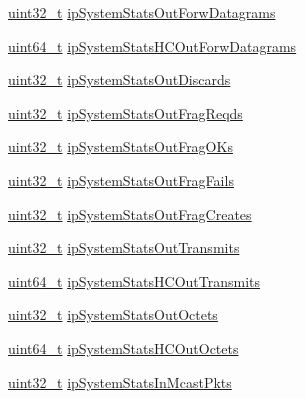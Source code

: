 \begin{DoxyCompactItemize}
\item 
\hyperlink{stdint_8h_a435d1572bf3f880d55459d9805097f62}{uint32\+\_\+t} \hyperlink{structIpMibIpSystemStatsEntry_a7b19227919fc80e74a32c51abe78580d}{ip\+System\+Stats\+Out\+Forw\+Datagrams}
\item 
\hyperlink{stdint_8h_aec6fcb673ff035718c238c8c9d544c47}{uint64\+\_\+t} \hyperlink{structIpMibIpSystemStatsEntry_a7a942eb4f7ddbf56b06186c30c6f6cf8}{ip\+System\+Stats\+H\+C\+Out\+Forw\+Datagrams}
\item 
\hyperlink{stdint_8h_a435d1572bf3f880d55459d9805097f62}{uint32\+\_\+t} \hyperlink{structIpMibIpSystemStatsEntry_a9f64d24e8d59a4f1aef22f0373aa34aa}{ip\+System\+Stats\+Out\+Discards}
\item 
\hyperlink{stdint_8h_a435d1572bf3f880d55459d9805097f62}{uint32\+\_\+t} \hyperlink{structIpMibIpSystemStatsEntry_a2956e47b05e37ace93061c103fb4c930}{ip\+System\+Stats\+Out\+Frag\+Reqds}
\item 
\hyperlink{stdint_8h_a435d1572bf3f880d55459d9805097f62}{uint32\+\_\+t} \hyperlink{structIpMibIpSystemStatsEntry_aefaf0fd7a546f5d0adb8e90cce69d9cb}{ip\+System\+Stats\+Out\+Frag\+O\+Ks}
\item 
\hyperlink{stdint_8h_a435d1572bf3f880d55459d9805097f62}{uint32\+\_\+t} \hyperlink{structIpMibIpSystemStatsEntry_a9274bc5987fe84f07aa9e649dbaad1aa}{ip\+System\+Stats\+Out\+Frag\+Fails}
\item 
\hyperlink{stdint_8h_a435d1572bf3f880d55459d9805097f62}{uint32\+\_\+t} \hyperlink{structIpMibIpSystemStatsEntry_ae81f26cf10fd2f3e0b0f8358aad81c16}{ip\+System\+Stats\+Out\+Frag\+Creates}
\item 
\hyperlink{stdint_8h_a435d1572bf3f880d55459d9805097f62}{uint32\+\_\+t} \hyperlink{structIpMibIpSystemStatsEntry_a222abab82d71d1b207bcc7eba30b5729}{ip\+System\+Stats\+Out\+Transmits}
\item 
\hyperlink{stdint_8h_aec6fcb673ff035718c238c8c9d544c47}{uint64\+\_\+t} \hyperlink{structIpMibIpSystemStatsEntry_a1d024a91d039ca18b02b3da38f87e3a0}{ip\+System\+Stats\+H\+C\+Out\+Transmits}
\item 
\hyperlink{stdint_8h_a435d1572bf3f880d55459d9805097f62}{uint32\+\_\+t} \hyperlink{structIpMibIpSystemStatsEntry_a5a4ed46c4bbddd9f901dc2ceb8301d10}{ip\+System\+Stats\+Out\+Octets}
\item 
\hyperlink{stdint_8h_aec6fcb673ff035718c238c8c9d544c47}{uint64\+\_\+t} \hyperlink{structIpMibIpSystemStatsEntry_adb5213d81c59d2e7c35b1739ad16ee9f}{ip\+System\+Stats\+H\+C\+Out\+Octets}
\item 
\hyperlink{stdint_8h_a435d1572bf3f880d55459d9805097f62}{uint32\+\_\+t} \hyperlink{structIpMibIpSystemStatsEntry_a424ac15230e7399beb1b345b84dabc3a}{ip\+System\+Stats\+In\+Mcast\+Pkts}

\end{DoxyCompactItemize}
